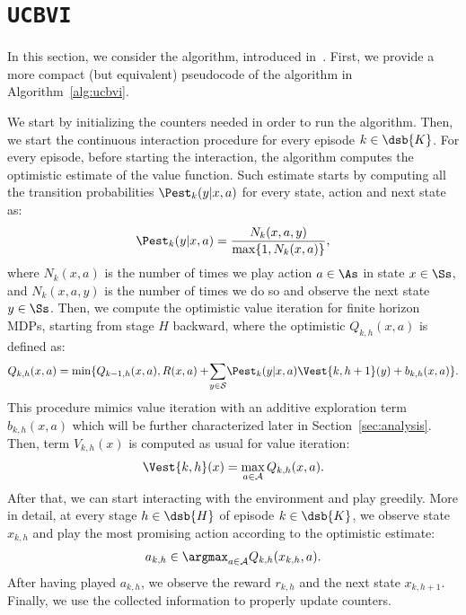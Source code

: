 \section{\texttt{UCBVI}}

In this section, we consider the \ucbvi algorithm, introduced in~\citep{azar2017minimax}. First, we provide a more compact (but equivalent) pseudocode of the algorithm in Algorithm~\ref{alg:ucbvi}. 

We start by initializing the counters needed in order to run the algorithm. Then, we start the continuous interaction procedure for every episode $k\in\dsb{K}$. For every episode, before starting the interaction, the algorithm computes the optimistic estimate of the value function. Such estimate starts by computing all the transition probabilities $\Pest_k (y | x, a)$ for every state, action and next state as:
\begin{align}
    \Pest_k (y | x, a) = \frac{N_k(x, a, y)}{\max\{1,N_k(x, a)\}},
\end{align}
where $N_k(x, a)$ is the number of times we play action $a\in\As$ in state $x\in\Ss$, and $N_k(x, a, y)$ is the number of times we do so and observe the next state $y\in\Ss$. Then, we compute the optimistic value iteration for finite horizon MDPs, starting from stage $H$ backward, where the optimistic $Q_{k,h} (x,a)$ is defined as:
\begin{align*}
    Q_{k,h} (x,a) = \min \{ Q_{k-1,h} (x,a), R (x,a) + \! \sum_{y \in \mathcal{S}} \! \Pest_k (y | x, a) \Vest{k,h+1}(y) + b_{k,h} (x, a) \}.
\end{align*}
This procedure mimics value iteration with an additive exploration term $b_{k,h} (x, a)$ which will be further characterized later in Section~\ref{sec:analysis}. Then, term $V_{k,h} (x)$ is computed as usual for value iteration:
\begin{align*}
    \Vest{k,h}(x) = \max_{a \in \mathcal{A}} Q_{k,h}(x, a).
\end{align*}
After that, we can start interacting with the environment and play greedily. More in detail, at every stage $h\in\dsb{H}$ of episode $k\in\dsb{K}$, we observe state $x_{k,h}$ and play the most promising action according to the optimistic estimate:
\begin{align*}
a_{k,h} \in \argmax_{a \in \mathcal{A}} Q_{k,h} (x_{k,h}, a).
\end{align*}
After having played $a_{k,h}$, we observe the reward $r_{k,h}$ and the next state $x_{k,h+1}$. Finally, we use the collected information to properly update counters.

